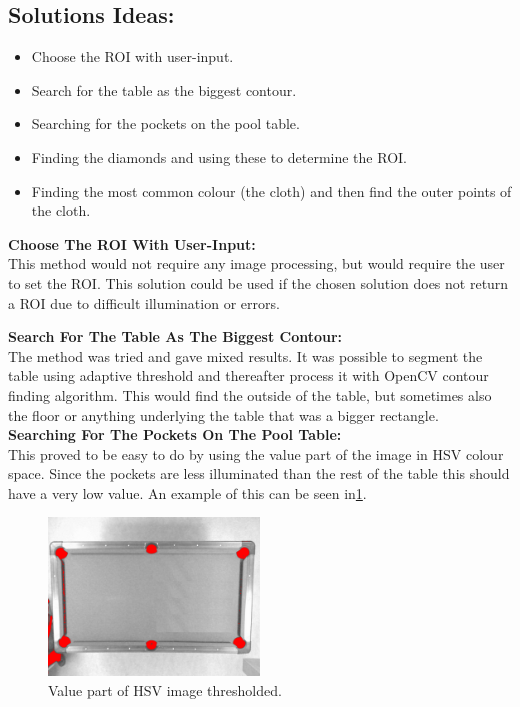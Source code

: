 \subsection{Solutions Ideas:}

\begin{itemize}
\setlength{\itemsep}{0mm}
	\item Choose the ROI with user-input.
	\item Search for the table as the biggest contour.
	\item Searching for the pockets on the pool table.
	\item Finding the diamonds and using these to determine the ROI.
	\item Finding the most common colour (the cloth) and then find the outer points of the cloth.
\end{itemize}

\textbf{Choose The ROI With User-Input:}\\
This method would not require any image processing, but would require the user to set the ROI. This solution could be used if the chosen solution does not return a ROI due to difficult illumination or errors.

\textbf{Search For The Table As The Biggest Contour:}\\
The method was tried and gave mixed results. It was possible to segment the table using adaptive threshold and thereafter process it with OpenCV \cite{opencv} contour finding algorithm. This would find the outside of the table, but sometimes also the floor or anything underlying the table that was a bigger rectangle. \\

\textbf{Searching For The Pockets On The Pool Table:}\\
This proved to be easy to do by using the value part of the image in HSV colour space. Since the pockets are less illuminated than the rest of the table this should have a very low value. An example of this can be seen in\ref{fig:value_thres}. 

\begin{figure}[H]
\begin{center}
\leavevmode
\includegraphics[width=0.5\textwidth]{images/value_thres}
\end{center}
\caption{Value part of HSV image thresholded.}
\label{fig:value_thres}
\end{figure}

